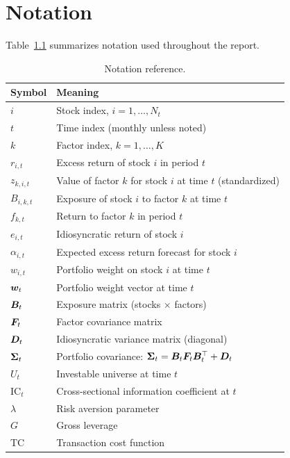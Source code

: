 \chapter{Notation}
\label{app:notation}

Table~\ref{tab:notation} summarizes notation used throughout the report.

\begin{table}[H]
\centering
\caption{Notation reference.}
\label{tab:notation}
\small
\begin{tabular}{ll}
\toprule
Symbol & Meaning \\
\midrule
$i$ & Stock index, $i = 1, \ldots, N_t$ \\
$t$ & Time index (monthly unless noted) \\
$k$ & Factor index, $k = 1, \ldots, K$ \\
$r_{i,t}$ & Excess return of stock $i$ in period $t$ \\
$z_{k,i,t}$ & Value of factor $k$ for stock $i$ at time $t$ (standardized) \\
$B_{i,k,t}$ & Exposure of stock $i$ to factor $k$ at time $t$ \\
$f_{k,t}$ & Return to factor $k$ in period $t$ \\
$e_{i,t}$ & Idiosyncratic return of stock $i$ \\
$\alpha_{i,t}$ & Expected excess return forecast for stock $i$ \\
$w_{i,t}$ & Portfolio weight on stock $i$ at time $t$ \\
$\boldsymbol{w}_t$ & Portfolio weight vector at time $t$ \\
$\boldsymbol{B}_t$ & Exposure matrix (stocks $\times$ factors) \\
$\boldsymbol{F}_t$ & Factor covariance matrix \\
$\boldsymbol{D}_t$ & Idiosyncratic variance matrix (diagonal) \\
$\boldsymbol{\Sigma}_t$ & Portfolio covariance: $\boldsymbol{\Sigma}_t = \boldsymbol{B}_t \boldsymbol{F}_t \boldsymbol{B}_t^{\top} + \boldsymbol{D}_t$ \\
$U_t$ & Investable universe at time $t$ \\
$\text{IC}_t$ & Cross-sectional information coefficient at $t$ \\
$\lambda$ & Risk aversion parameter \\
$G$ & Gross leverage \\
TC & Transaction cost function \\
\bottomrule
\end{tabular}
\end{table}